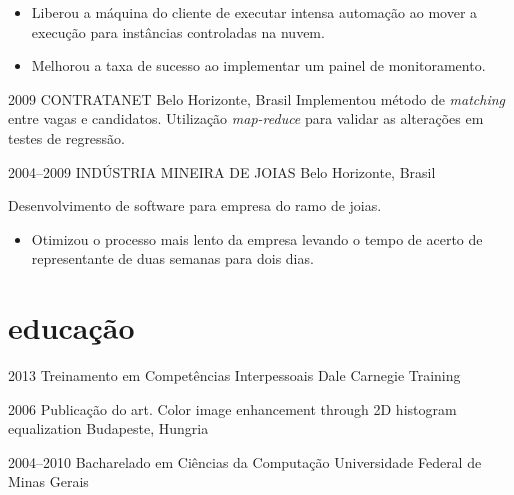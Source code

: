 \documentclass[]{friggeri-cv}
\begin{document}
\begin{entrylist}
{  \begin{itemize}
    \item Liberou a máquina do cliente de executar intensa automação ao mover a execução para instâncias controladas na nuvem.
    \item Melhorou a taxa de sucesso ao implementar um painel de monitoramento.      
  \end{itemize}
}


\entry
{2009}
{CONTRATANET}
{Belo Horizonte, Brasil}
{Implementou método de \textit{matching} entre vagas e candidatos. Utilização \textit{map-reduce} para validar as alterações em testes de regressão.
}


 \entry
 {2004--2009}
 {INDÚSTRIA MINEIRA DE JOIAS}
{Belo Horizonte, Brasil}
 { Desenvolvimento de software para empresa do ramo de joias.
  \begin{itemize}
    \item Otimizou o processo mais lento da empresa levando o tempo de acerto de representante de duas semanas para dois dias.
  \end{itemize} }
  

\end{entrylist}

\section{educação}


\begin{entrylist}

\entry
{2013}
{{\normalfont Treinamento em} Competências Interpessoais}
{Dale Carnegie Training}

\entry
{2006}
{Publicação do art. {\normalfont Color image enhancement through 2D histogram equalization}}
{Budapeste, Hungria}

\entry
{2004--2010}
{{\normalfont Bacharelado em} Ciências da Computação}
{Universidade Federal de Minas Gerais}

\end{entrylist}
\end{document}
